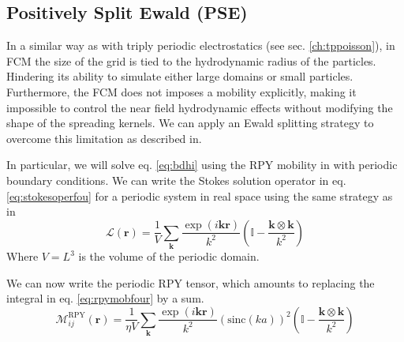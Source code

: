 \documentclass[ twoside,openright,titlepage,numbers=noenddot,%
headinclude,footinclude,cleardoublepage=empty,abstract=on,
BCOR=5mm,paper=a4,fontsize=11pt, dvipsnames
]{scrreprt}
\renewcommand{\vec}[1]{\bm{#1}}
\newcommand{\tens}[1]{\bm{\mathcal{#1}}}
\newcommand{\oper}[1]{\mathcal{#1}}
\newcommand{\sinc}{\textrm{sinc}}
\newcommand{\fpos}{r}
\begin{document}
\subsection{Positively Split Ewald (PSE)}\label{sec:pse}
In a similar way as with triply periodic electrostatics (see sec. \ref{ch:tppoisson}), in \gls{FCM} the size of the grid is tied to the hydrodynamic radius of the particles. Hindering its ability to simulate either large domains or small particles. Furthermore, the \gls{FCM} does not imposes a mobility explicitly, making it impossible to control the near field hydrodynamic effects without modifying the shape of the spreading kernels. We can apply an Ewald splitting strategy to overcome this limitation as described in\cite{Fiore2017}.

In particular, we will solve eq. \eqref{eq:bdhi} using the \gls{RPY} mobility in with periodic boundary conditions. We can write the Stokes solution operator in eq. \eqref{eq:stokesoperfou} for a periodic system in real space using the same strategy as in\cite{Hasimoto1959}
\begin{equation}
  \label{eq:psestokesoper}
  \oper{L}(\vec{\fpos}) = \frac{1}{V}\sum_{\vec{k}} \frac{\exp(i\vec{k}\vec{r})}{k^2}\left(\mathbb{I} - \frac{\vec{k}\otimes\vec{k}}{k^2}\right)
\end{equation}
Where $V = L^3$ is the volume of the periodic domain.

We can now write the periodic \gls{RPY} tensor, which amounts to replacing the integral in eq. \eqref{eq:rpymobfour} by a sum.
\begin{equation}
  \label{eq:pserpyfou}
  \tens{M}_{ij}^{\textrm{RPY}}(\vec{r})= \frac{1}{\eta V} \sum_{\vec{k}} \frac{\exp(i\vec{k}\vec{r})}{k^2}\left(\sinc(ka) \right)^2\left(\mathbb{I} - \frac{\vec{k}\otimes\vec{k}}{k^2}\right)
\end{equation}
\end{document}
